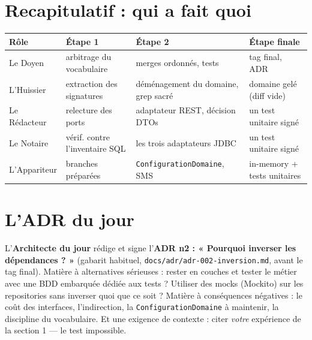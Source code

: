 \documentclass[a4paper,11pt]{article}
\begin{document}
\section{Recapitulatif : qui a fait quoi}

\begin{center}
\small
\begin{tabular}{p{}p{}p{}p{}}
\toprule
\textbf{Rôle} & \textbf{Étape 1} & \textbf{Étape 2} & \textbf{Étape finale} \\
\midrule
Le Doyen & arbitrage du vocabulaire & merges ordonnés, tests & tag final, ADR \\
\addlinespace
L'Huissier & extraction des signatures & déménagement du domaine, grep sacré & domaine gelé (diff vide) \\
\addlinespace
Le Rédacteur & relecture des ports & adaptateur REST, décision DTOs & un test unitaire signé \\
\addlinespace
Le Notaire & vérif. contre l'inventaire SQL & les trois adaptateurs JDBC & un test unitaire signé \\
\addlinespace
L'Appariteur & branches préparées & \texttt{ConfigurationDomaine}, SMS & in-memory + tests unitaires \\
\bottomrule
\end{tabular}
\end{center}

\section{L'ADR du jour}

L'\textbf{Architecte du jour} rédige et signe l'\textbf{ADR n2 :
« Pourquoi inverser les dépendances ? »} (gabarit habituel,
\texttt{docs/adr/adr-002-inversion.md}, avant le tag final). Matière à
alternatives sérieuses : rester en couches et tester le métier avec une
BDD embarquée dédiée aux tests ? Utiliser des mocks (Mockito) sur les
repositories sans inverser quoi que ce soit ? Matière à conséquences
négatives : le coût des interfaces, l'indirection, la
\texttt{ConfigurationDomaine} à maintenir, la discipline du vocabulaire.
Et une exigence de contexte : citer \emph{votre} expérience de la
section 1 --- le test impossible.

\end{document}
